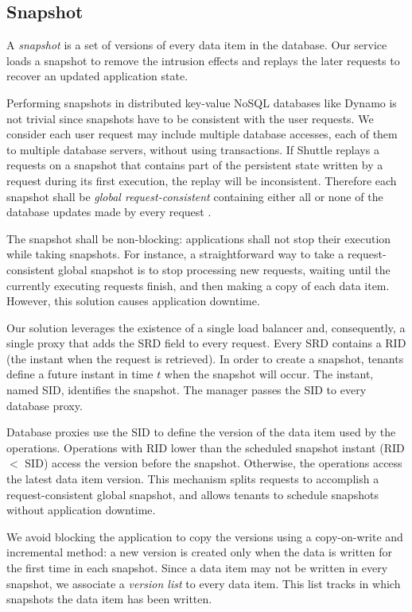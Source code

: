 \subsection{Snapshot}
\label{sec:architecture:snapshot}

A \emph{snapshot} is a set of versions of every data item in the database. Our service loads a snapshot to remove the intrusion effects and replays the later requests to recover an updated application state. 

Performing snapshots in distributed key-value NoSQL databases like Dynamo is not trivial since snapshots have to be consistent with the user requests. We consider each user request may include multiple database accesses, each of them to multiple database servers, without using transactions. 
If Shuttle replays a requests on a snapshot that contains part of the persistent state written by a request during its first execution, the replay will be inconsistent. Therefore each snapshot shall be \emph{global request-consistent} containing either all or none of the database updates made by every request \cite{checkpoint-survey}. 

The snapshot shall be non-blocking: applications shall not stop their execution while taking snapshots. For instance, a straightforward way to take a request-consistent global snapshot is to stop processing new requests, waiting until the currently executing requests finish, and then making a copy of each data item. However, this solution causes application downtime.

Our solution leverages the existence of a single load balancer and, consequently, a single proxy that adds the \ac{SRD} field to every request. Every \ac{SRD} contains a \ac{RID} (the instant when the request is retrieved). In order to create a snapshot, tenants define a future instant in time $t$ when the snapshot will occur. The instant, named \acf{SID}, identifies the snapshot. The manager passes the \ac{SID} to every database proxy.

Database proxies use the \ac{SID} to define the version of the data item used by the operations. Operations with \acf{RID} lower than the scheduled snapshot instant (\ac{RID} $<$ \ac{SID}) access the version before the snapshot. Otherwise, the operations access the latest data item version. This mechanism splits requests to accomplish a request-consistent global snapshot, and allows tenants to schedule snapshots without application downtime. 

We avoid blocking the application to copy the versions using a copy-on-write and incremental method: a new version is created only when the data is written for the first time in each snapshot. Since a data item may not be written in every snapshot, we associate a \emph{version list} to every data item. This list tracks in which snapshots the data item has been written.

